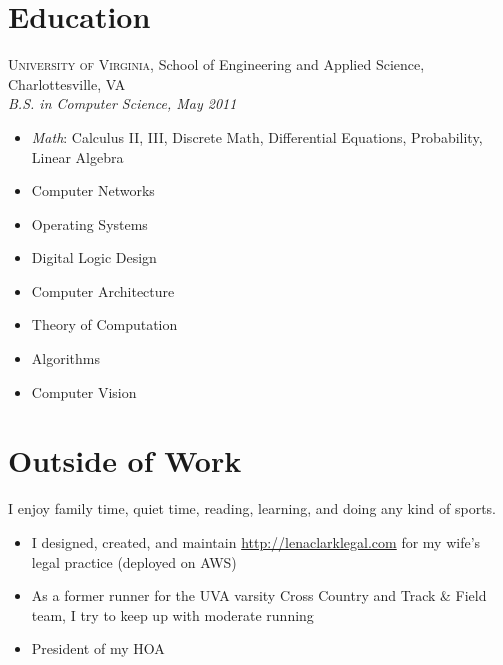 \documentclass[12pt]{article}
\begin{document}

\section*{Education}

\textsc{University of Virginia}, School of Engineering and Applied Science,
Charlottesville, VA \\
\textit{B.S. in Computer Science, May 2011}

\begin{multicols}{3}
  \raggedright
  \begin{itemize}
  \item \textit{Math}: Calculus II, III, Discrete Math, Differential
    Equations, Probability, Linear Algebra
  \item Computer Networks
  \item Operating Systems
  \item Digital Logic Design
  \item Computer Architecture
  \item Theory of Computation
  \item Algorithms
  \item Computer Vision
  \end{itemize}
\end{multicols}


\section*{Outside of Work}

I enjoy family time, quiet time, reading, learning, and doing any kind of
sports.

\begin{itemize}
\item I designed, created, and maintain \url{http://lenaclarklegal.com} for my
  wife's legal practice (deployed on AWS)
\item As a former runner for the UVA varsity Cross Country and Track \& Field
  team, I try to keep up with moderate running
\item President of my HOA
\end{itemize}
\end{document}
